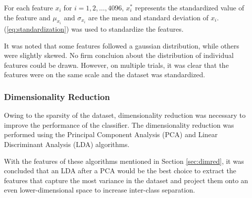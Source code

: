 \documentclass[conference]{IEEEtran}
\begin{document}
    For each feature $x_{i}$ for $i = 1, 2, \dots, 4096$, $x_{i}^{*}$ represents the standardized value of the feature
    and $\mu_{x_{i}}$ and $\sigma_{x_{i}}$ are the mean and standard deviation of $x_{i}$.
    (\ref{eq:standardization}) was used to standardize the features.

    It was noted that some features followed a gaussian distribution, while others were slightly skewed.
    No firm concluion about the distribution of individual features could be drawn.
    However, on multiple trials, it was clear that the features were on the same scale and the dataset was standardized.

    \subsubsection{Dimensionality Reduction}
    \label{sec:dimreduction}
    Owing to the sparsity of the dataset, dimensionality reduction was necessary to improve the performance of the classifier.
    The dimensionality reduction was performed using the Principal Component Analysis (PCA) and Linear Discriminant Analysis (LDA) algorithms.

    With the features of these algorithms mentioned in Section \ref{sec:dimred}, it was concluded that an LDA after a PCA would be the best choice
    to extract the features that capture the most variance in the dataset and project them onto an even lower-dimensional space to increase inter-class separation.
\end{document}
